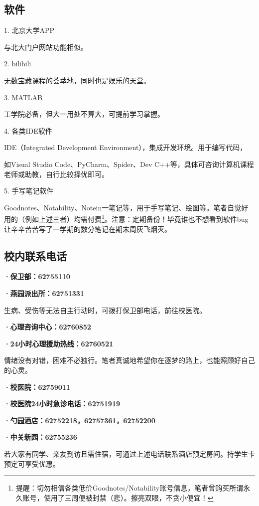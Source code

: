 \subsection{软件}

1. 北京大学APP

与北大门户网站功能相似。

\vspace{10pt}

2. bilibili

无数宝藏课程的荟萃地，同时也是娱乐的天堂。

\vspace{10pt}

3. MATLAB

工学院必备，但大一用处不算大，可提前学习掌握。

\vspace{10pt}

4. 各类IDE软件

IDE（Integrated Development Environment），集成开发环境。用于编写代码，

如Visual Studio Code、PyCharm、Spider、Dev C++等，具体可咨询计算机课程老师或助教，自行比较择优即可。

\vspace{10pt}

5. 手写笔记软件

Goodnotes、Notability、Notein一笔记等，用于手写笔记、绘图等。笔者自觉好用的（例如上述三者）均需付费\footnote{提醒：切勿相信各类低价Goodnotes/Notability账号信息，笔者曾购买所谓永久账号，使用了三周便被封禁（悲）。擦亮双眼，不贪小便宜！}。注意：定期备份！毕竟谁也不想看到软件bug让辛辛苦苦写了一学期的数分笔记在期末周灰飞烟灭。

\subsection{校内联系电话}

\textbf{·保卫部：62755110}

\textbf{·燕园派出所：62751331}

生病、受伤等无法自主行动时，可拨打保卫部电话，前往校医院。

\vspace{10pt}

\textbf{·心理咨询中心：62760852}

\textbf{·24小时心理援助热线：62760521}

情绪没有对错，困难不必独行。笔者真诚地希望你在逐梦的路上，也能照顾好自己的心灵。

\vspace{10pt}

\textbf{·校医院：62759011}

\textbf{·校医院24小时急诊电话：62751919}

\vspace{10pt}

\textbf{·勺园酒店：62752218，62757361，62752200}

\textbf{·中关新园：62755236}

若大家有同学、亲友到访且需住宿，可通过上述电话联系酒店预定房间。持学生卡预定可享受优惠。
